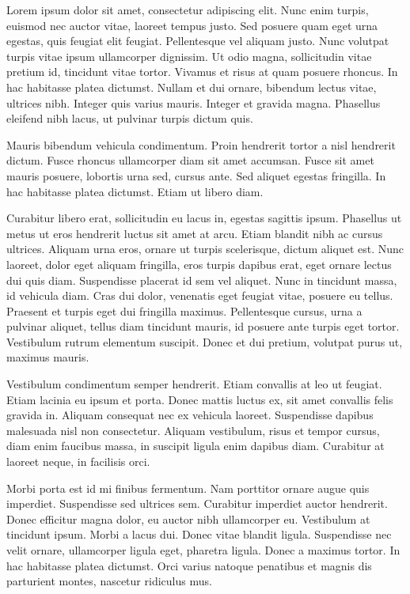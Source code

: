 Lorem ipsum dolor sit amet, consectetur adipiscing elit. Nunc enim turpis, euismod nec auctor vitae, laoreet tempus justo. Sed posuere quam eget urna egestas, quis feugiat elit feugiat. Pellentesque vel aliquam justo. Nunc volutpat turpis vitae ipsum ullamcorper dignissim. Ut odio magna, sollicitudin vitae pretium id, tincidunt vitae tortor. Vivamus et risus at quam posuere rhoncus. In hac habitasse platea dictumst. Nullam et dui ornare, bibendum lectus vitae, ultrices nibh. Integer quis varius mauris. Integer et gravida magna. Phasellus eleifend nibh lacus, ut pulvinar turpis dictum quis.

Mauris bibendum vehicula condimentum. Proin hendrerit tortor a nisl hendrerit dictum. Fusce rhoncus ullamcorper diam sit amet accumsan. Fusce sit amet mauris posuere, lobortis urna sed, cursus ante. Sed aliquet egestas fringilla. In hac habitasse platea dictumst. Etiam ut libero diam.

Curabitur libero erat, sollicitudin eu lacus in, egestas sagittis ipsum. Phasellus ut metus ut eros hendrerit luctus sit amet at arcu. Etiam blandit nibh ac cursus ultrices. Aliquam urna eros, ornare ut turpis scelerisque, dictum aliquet est. Nunc laoreet, dolor eget aliquam fringilla, eros turpis dapibus erat, eget ornare lectus dui quis diam. Suspendisse placerat id sem vel aliquet. Nunc in tincidunt massa, id vehicula diam. Cras dui dolor, venenatis eget feugiat vitae, posuere eu tellus. Praesent et turpis eget dui fringilla maximus. Pellentesque cursus, urna a pulvinar aliquet, tellus diam tincidunt mauris, id posuere ante turpis eget tortor. Vestibulum rutrum elementum suscipit. Donec et dui pretium, volutpat purus ut, maximus mauris.

Vestibulum condimentum semper hendrerit. Etiam convallis at leo ut feugiat. Etiam lacinia eu ipsum et porta. Donec mattis luctus ex, sit amet convallis felis gravida in. Aliquam consequat nec ex vehicula laoreet. Suspendisse dapibus malesuada nisl non consectetur. Aliquam vestibulum, risus et tempor cursus, diam enim faucibus massa, in suscipit ligula enim dapibus diam. Curabitur at laoreet neque, in facilisis orci.

Morbi porta est id mi finibus fermentum. Nam porttitor ornare augue quis imperdiet. Suspendisse sed ultrices sem. Curabitur imperdiet auctor hendrerit. Donec efficitur magna dolor, eu auctor nibh ullamcorper eu. Vestibulum at tincidunt ipsum. Morbi a lacus dui. Donec vitae blandit ligula. Suspendisse nec velit ornare, ullamcorper ligula eget, pharetra ligula. Donec a maximus tortor. In hac habitasse platea dictumst. Orci varius natoque penatibus et magnis dis parturient montes, nascetur ridiculus mus.

